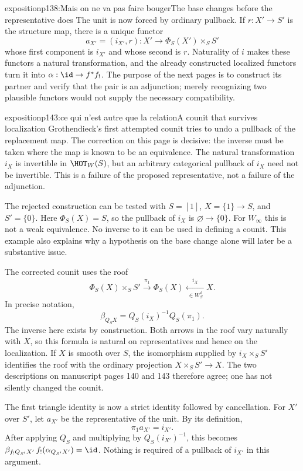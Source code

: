 \begin{dcomment}{exposition}{p138:Mais on ne va pas faire bouger}{The base changes before the representative does}
The unit is now forced by ordinary pullback. If $r:X'\to S'$ is the structure map, there is a unique functor
\[
 a_{X'}=(i_{X'},r):X'\longrightarrow\Phi_S(X')\times_S S'
\]
whose first component is $i_{X'}$ and whose second is $r$. Naturality of $i$ makes these functors a natural transformation, and the already constructed localized functors turn it into $\alpha:\id\to f^*f_!$. The purpose of the next pages is to construct its partner and verify that the pair is an adjunction; merely recognizing two plausible functors would not supply the necessary compatibility.
\end{dcomment}

\begin{dcomment}{exposition}{p143:ce qui n'est autre que la relation}{A counit that survives localization}
Grothendieck's first attempted counit tries to undo a pullback of the replacement map. The correction on this page is decisive: the inverse must be taken where the map is known to be an equivalence. The natural transformation $i_X$ is invertible in $\HOT_W(S)$, but an arbitrary categorical pullback of $i_X$ need not be invertible. This is a failure of the proposed representative, not a failure of the adjunction.

The rejected construction can be tested with $S=[1]$, $X=\{1\}\to S$, and $S'=\{0\}$. Here $\Phi_S(X)=S$, so the pullback of $i_X$ is $\varnothing\to\{0\}$. For $W_\infty$ this is not a weak equivalence. No inverse to it can be used in defining a counit. This example also explains why a hypothesis on the base change alone will later be a substantive issue.

The corrected counit uses the roof
\[
 \Phi_S(X)\times_S S'
 \xrightarrow{\pi_1}\Phi_S(X)
 \xleftarrow[\ \in W_S^{\mathrm d}\ ]{i_X} X.
\]
In precise notation,
\[
 \beta_{Q_SX}=Q_S(i_X)^{-1}Q_S(\pi_1).
\]
The inverse here exists by construction. Both arrows in the roof vary naturally with $X$, so this formula is natural on representatives and hence on the localization. If $X$ is smooth over $S$, the isomorphism supplied by $i_X\times_S S'$ identifies the roof with the ordinary projection $X\times_S S'\to X$. The two descriptions on manuscript pages 140 and 143 therefore agree; one has not silently changed the counit.

The first triangle identity is now a strict identity followed by cancellation. For $X'$ over $S'$, let $a_{X'}$ be the representative of the unit. By its definition,
\[
 \pi_1a_{X'}=i_{X'}.
\]
After applying $Q_S$ and multiplying by $Q_S(i_{X'})^{-1}$, this becomes $\beta_{f_!Q_{S'}X'}\,f_!(\alpha_{Q_{S'}X'})=\id$. Nothing is required of a pullback of $i_{X'}$ in this argument.


\end{dcomment}
